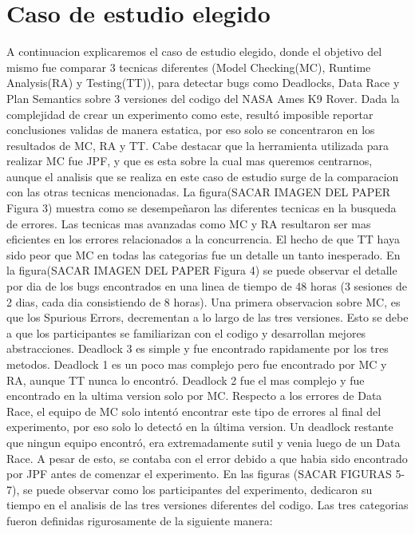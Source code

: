 \documentclass[runningheads]{llncs}
\begin{document}
\section{Caso de estudio elegido}

A continuacion explicaremos el caso de estudio elegido, donde el objetivo del mismo fue comparar 3 tecnicas diferentes (Model Checking(MC), Runtime Analysis(RA) y Testing(TT)), para detectar bugs como Deadlocks, Data Race y Plan Semantics sobre 3 versiones del codigo del NASA Ames K9 Rover.
Dada la complejidad de crear un experimento como este, result\'o imposible reportar conclusiones validas de manera estatica, por eso solo se concentraron en los resultados de MC, RA y TT. Cabe destacar que la herramienta utilizada para realizar MC fue JPF, y que es esta sobre la cual mas queremos centrarnos, aunque el analisis que se realiza en este caso de estudio surge de la comparacion con las otras tecnicas mencionadas.
La figura(SACAR IMAGEN DEL PAPER  Figura 3) muestra como se desempe\~naron las diferentes tecnicas en la busqueda de errores. Las tecnicas mas avanzadas como MC y RA resultaron ser mas eficientes en los errores relacionados a la concurrencia. El hecho de que TT haya sido peor que MC en todas las categorias fue un detalle un tanto inesperado.
En la figura(SACAR IMAGEN DEL PAPER  Figura 4) se puede observar el detalle por dia de los bugs encontrados en una linea de tiempo de 48 horas (3 sesiones de 2 dias, cada dia consistiendo de 8 horas). Una primera observacion sobre MC, es que los Spurious Errors, decrementan a lo largo de las tres versiones. Esto se debe a que los participantes se familiarizan con el codigo y desarrollan mejores abstracciones. Deadlock 3 es simple y fue encontrado rapidamente por los tres metodos. Deadlock 1 es un poco mas complejo pero fue encontrado por MC y RA, aunque TT nunca lo encontr\'o. Deadlock 2 fue el mas complejo y fue encontrado en la ultima version solo por MC. Respecto a los errores de Data Race, el equipo de MC solo intentó encontrar este tipo de errores al final del experimento, por eso solo lo detect\'o en la \'ultima version. Un deadlock restante que ningun equipo encontr\'o, era extremadamente sutil y venia luego de un Data Race. A pesar de esto, se contaba con el error debido a que habia sido encontrado por JPF antes de comenzar el experimento.
En las figuras (SACAR FIGURAS 5-7), se puede observar como los participantes del experimento, dedicaron su tiempo en el analisis de las tres versiones diferentes del codigo. Las tres categorias fueron definidas rigurosamente de la siguiente manera:
\end{document}
